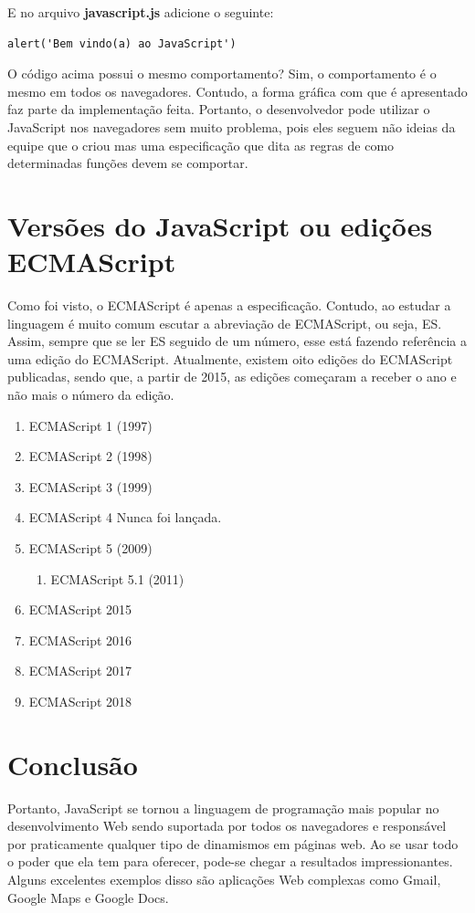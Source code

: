 E no arquivo \textbf{javascript.js} adicione o seguinte:

\begin{lstlisting}
alert('Bem vindo(a) ao JavaScript')
\end{lstlisting}

O código acima possui o mesmo comportamento? Sim, o comportamento é o mesmo em todos os navegadores. Contudo, a forma gráfica com que é apresentado faz parte da implementação feita. Portanto, o desenvolvedor pode utilizar o JavaScript nos navegadores sem muito problema, pois eles seguem não ideias da equipe que o criou mas uma especificação que dita as regras de como determinadas funções devem se comportar.

\section{Versões do JavaScript ou edições ECMAScript}

Como foi visto, o ECMAScript é apenas a especificação. Contudo, ao estudar a 
linguagem é muito comum escutar a abreviação de ECMAScript, ou seja, ES. Assim, sempre que se ler ES seguido de um número, esse está fazendo referência a uma edição do ECMAScript. Atualmente, existem oito edições do ECMAScript publicadas, sendo que, a partir de 2015, as edições começaram a receber o ano e não mais o número da edição.

\begin{enumerate}
  \item ECMAScript 1 (1997)	
  \item ECMAScript 2 (1998)	
  \item ECMAScript 3 (1999)	
  \item ECMAScript 4	Nunca foi lançada.
  \item ECMAScript 5 (2009)
    \begin{enumerate}[label*=\arabic*.]
    \item ECMAScript 5.1 (2011)
    \end{enumerate}
  \item ECMAScript 2015
  \item ECMAScript 2016
  \item ECMAScript 2017
  \item ECMAScript 2018
\end{enumerate}

\section{Conclusão}
Portanto, JavaScript se tornou a linguagem de programação mais popular no 
desenvolvimento Web sendo suportada por todos os navegadores e responsável por praticamente qualquer tipo de dinamismos em páginas web. Ao se usar todo o poder que ela tem para oferecer, pode-se chegar a resultados impressionantes. Alguns excelentes exemplos disso são aplicações Web complexas como Gmail, Google Maps e Google Docs. 
